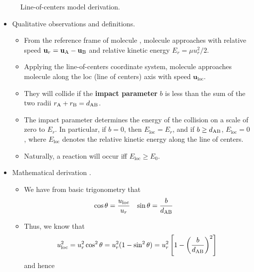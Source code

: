\documentclass[../notes.tex]{subfiles}
\begin{document}
\begin{itemize}
\begin{figure}[h!]
        \caption{Line-of-centers model derivation.}
        \label{fig:lineOfCentersDeriv}
    \end{figure}
    \begin{itemize}
        \item Qualitative observations and definitions.
        \begin{itemize}
            \item From the reference frame of molecule , molecule  approaches with relative speed $\mathbf{u}_r=\mathbf{u}_{\ce{A}}-\mathbf{u}_{\ce{B}}$ and relative kinetic energy $E_r=\mu u_r^2/2$.
            \item Applying the line-of-centers coordinate system, molecule  approaches molecule  along the loc (line of centers) axis with speed $\mathbf{u}_\text{loc}$.
            \item They will collide if the \textbf{impact parameter} $b$ is less than the sum of the two radii $r_{\ce{A}}+r_{\ce{B}}=d_{\ce{A}\ce{B}}$.
            \item The impact parameter determines the energy of the collision on a scale of zero to $E_r$. In particular, if $b=0$, then $E_\text{loc}=E_r$, and if $b\geq d_{\ce{A}\ce{B}}$, $E_\text{loc}=0$, where $E_\text{loc}$ denotes the relative kinetic energy along the line of centers.
            \item Naturally, a reaction will occur iff $E_\text{loc}\geq E_0$.
        \end{itemize}
        \item Mathematical derivation \parencite{bib:LineOfCenters}.
        \begin{itemize}
            \item We have from basic trigonometry that
            \begin{align*}
                \cos\theta &= \frac{u_\text{loc}}{u_r}&
                \sin\theta &= \frac{b}{d_{\ce{A}\ce{B}}}
            \end{align*}
            \item Thus, we know that
            \begin{equation*}
                u_\text{loc}^2 = u_r^2\cos^2\theta
                = u_r^2(1-\sin^2\theta)
                = u_r^2\left[ 1-\left( \frac{b}{d_{\ce{A}\ce{B}}} \right)^2 \right]
            \end{equation*}
            and hence

\end{itemize}
\end{itemize}
\end{itemize}
\end{document}

